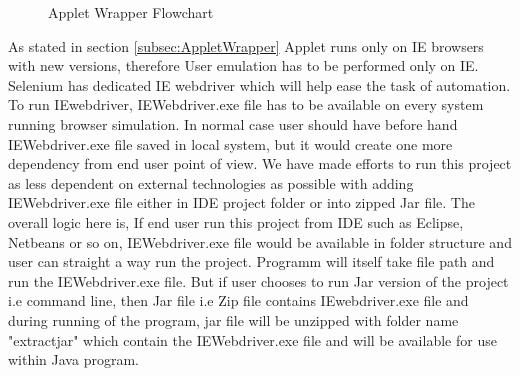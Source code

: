 \documentclass[article,type=msc,colorback,accentcolor=tud9c,twoside,11pt]{tudthesis}
\begin{document}
\begin{center}
\begin{figure}[h]
  \caption{Applet Wrapper Flowchart} 
  \label{fig:AppletwrapperAlgorithm}
\end{figure}
\end{center}
As stated in section \ref{subsec:AppletWrapper} Applet runs only on IE browsers with new versions, therefore User emulation has to be performed only on IE. Selenium has dedicated IE webdriver which will help ease the task of automation. To run IEwebdriver, IEWebdriver.exe file has to be available on every system running browser simulation. In normal case user should have before hand IEWebdriver.exe file saved in local system, but it would create one more dependency from end user point of view. We have made efforts to run this project as less dependent on external technologies as possible with adding IEWebdriver.exe file either in IDE project folder or into zipped Jar file. The overall logic here is, If end user run this project from IDE such as Eclipse, Netbeans or so on, IEWebdriver.exe file would be available in folder structure and user can straight a way run the project. Programm will itself take file path and run the IEWebdriver.exe file. But if user chooses to run Jar version of the project i.e command line, then Jar file i.e Zip file contains IEwebdriver.exe file and during running of the program, jar file will be unzipped with folder name "extractjar" which contain the IEWebdriver.exe file and will be available for use within Java program.
\end{document}
